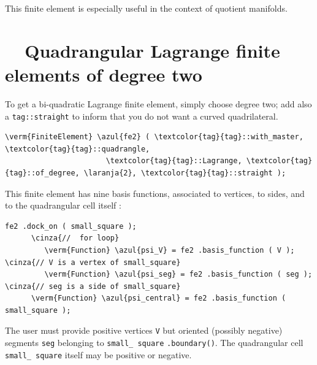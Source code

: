 This finite element is especially useful in the context of quotient manifolds.


\section{~~Quadrangular Lagrange finite elements of degree two}
\label{\numb section 6.\numb parag 8}

To get a bi-quadratic Lagrange finite element, simply choose degree two; add also a 
{\small\tt\textcolor{tag}{tag}::straight} to inform {\maniFEM} that you do not want
a curved quadrilateral.

\begin{Verbatim}[commandchars=\\\{\},formatcom=\small\tt,frame=single,
   label=parag-\ref{\numb section 6.\numb parag 8}.cpp,rulecolor=\color{moldura},
   baselinestretch=0.94,framesep=2mm                                            ]
   \verm{FiniteElement} \azul{fe2} ( \textcolor{tag}{tag}::with_master, \textcolor{tag}{tag}::quadrangle,
                       \textcolor{tag}{tag}::Lagrange, \textcolor{tag}{tag}::of_degree, \laranja{2}, \textcolor{tag}{tag}::straight );
\end{Verbatim}

This finite element has nine basis functions, associated to vertices, to sides, and to the
quadrangular cell itself :

\begin{Verbatim}[commandchars=\\\{\},formatcom=\small\tt,frame=single,
   label=parag-\ref{\numb section 6.\numb parag 8}.cpp,rulecolor=\color{moldura},
   baselinestretch=0.94,framesep=2mm                                            ]
      fe2 .dock_on ( small_square );
      \cinza{//  for loop}  
         \verm{Function} \azul{psi_V} = fe2 .basis_function ( V );   \cinza{// V is a vertex of small_square}
         \verm{Function} \azul{psi_seg} = fe2 .basis_function ( seg );  \cinza{// seg is a side of small_square}
      \verm{Function} \azul{psi_central} = fe2 .basis_function ( small_square );
\end{Verbatim}

The user must provide positive vertices {\small\tt V} but oriented (possibly negative) segments
{\small\tt seg} belonging to {\small\tt small\_\,square} {\small\tt .boundary()}.
The quadrangular cell {\small\tt small\_\,square} itself may be positive or negative.

